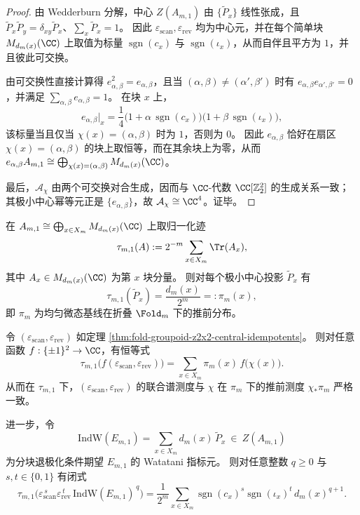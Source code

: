 \begin{proof}
由 Wedderburn 分解，中心 \(Z(A_{m,1})\) 由 \(\{\widetilde P_x\}\) 线性张成，且
\(\widetilde P_x\widetilde P_y=\delta_{xy}\widetilde P_x\)、\(\sum_x\widetilde P_x=1\)。
因此 \(\varepsilon_{\mathrm{scan}},\varepsilon_{\mathrm{rev}}\) 均为中心元，并在每个简单块 \(M_{d_m(x)}(\CC)\) 上取值为标量 \(\operatorname{sgn}(c_x)\) 与 \(\operatorname{sgn}(\iota_x)\)，从而自伴且平方为 \(1\)，并且彼此可交换。
\par
由可交换性直接计算得 \(e_{\alpha,\beta}^2=e_{\alpha,\beta}\)，且当 \((\alpha,\beta)\neq(\alpha',\beta')\) 时有 \(e_{\alpha,\beta}e_{\alpha',\beta'}=0\)，并满足 \(\sum_{\alpha,\beta}e_{\alpha,\beta}=1\)。
在块 \(x\) 上，
\[
e_{\alpha,\beta}\Big|_x
=
\frac14\bigl(1+\alpha\,\operatorname{sgn}(c_x)\bigr)\bigl(1+\beta\,\operatorname{sgn}(\iota_x)\bigr),
\]
该标量当且仅当 \(\chi(x)=(\alpha,\beta)\) 时为 \(1\)，否则为 \(0\)。
因此 \(e_{\alpha,\beta}\) 恰好在扇区 \(\chi(x)=(\alpha,\beta)\) 的块上取恒等，而在其余块上为零，从而
\(
e_{\alpha,\beta}A_{m,1}\cong \bigoplus_{\chi(x)=(\alpha,\beta)}M_{d_m(x)}(\CC)
\)。
\par
最后，\(\mathcal A_\chi\) 由两个可交换对合生成，因而与 \(\CC\)-代数 \(\CC[\mathbb Z_2^2]\) 的生成关系一致；其极小中心幂等元正是 \(\{e_{\alpha,\beta}\}\)，故 \(\mathcal A_\chi\cong \CC^4\)。证毕。
\end{proof}

\begin{theorem}\label{thm:fold-groupoid-z2x2-joint-spectral-measure}
在 \(A_{m,1}\cong\bigoplus_{x\in X_m}M_{d_m(x)}(\CC)\) 上取归一化迹
\[
\tau_{m,1}(A):=2^{-m}\sum_{x\in X_m}\Tr(A_x),
\]
其中 \(A_x\in M_{d_m(x)}(\CC)\) 为第 \(x\) 块分量。
则对每个极小中心投影 \(\widetilde P_x\) 有
\[
\tau_{m,1}(\widetilde P_x)=\frac{d_m(x)}{2^m}=: \pi_m(x),
\]
即 \(\pi_m\) 为均匀微态基线在折叠 \(\Fold_m\) 下的推前分布。
\par
令 \((\varepsilon_{\mathrm{scan}},\varepsilon_{\mathrm{rev}})\) 如定理 \ref{thm:fold-groupoid-z2x2-central-idempotents}。
则对任意函数 \(f:\{\pm1\}^2\to\CC\)，有恒等式
\[
\tau_{m,1}\!\bigl(f(\varepsilon_{\mathrm{scan}},\varepsilon_{\mathrm{rev}})\bigr)
=\sum_{x\in X_m}\pi_m(x)\,f\!\bigl(\chi(x)\bigr).
\]
从而在 \(\tau_{m,1}\) 下，\((\varepsilon_{\mathrm{scan}},\varepsilon_{\mathrm{rev}})\) 的联合谱测度与 \(\chi\) 在 \(\pi_m\) 下的推前测度 \(\chi_\ast\pi_m\) 严格一致。
\par
进一步，令
\[
\mathrm{IndW}(E_{m,1})=\sum_{x\in X_m} d_m(x)\,\widetilde P_x\ \in\ Z(A_{m,1})
\]
为分块退极化条件期望 \(E_{m,1}\) 的 Watatani 指标元。
则对任意整数 \(q\ge 0\) 与 \(s,t\in\{0,1\}\) 有闭式
\[
\tau_{m,1}\!\bigl(\varepsilon_{\mathrm{scan}}^{\,s}\varepsilon_{\mathrm{rev}}^{\,t}\,\mathrm{IndW}(E_{m,1})^{\,q}\bigr)
=
\frac{1}{2^m}\sum_{x\in X_m}\operatorname{sgn}(c_x)^{s}\operatorname{sgn}(\iota_x)^{t}\,d_m(x)^{q+1}.
\]
\end{theorem}

